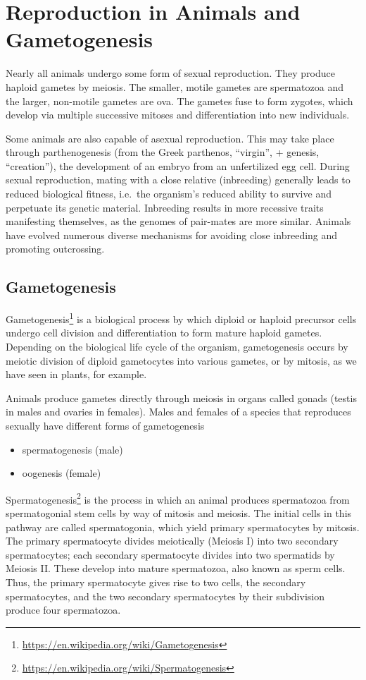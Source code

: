 \documentclass[]{book}
\providecommand{\tightlist}{%
  \setlength{\itemsep}{0pt}\setlength{\parskip}{0pt}}
\let\rmarkdownfootnote\footnote%
\def\footnote{\protect\rmarkdownfootnote}
\renewcommand{\href}[2]{#2\footnote{\url{#1}}}
\theoremstyle{definition}
\theoremstyle{definition}
\theoremstyle{definition}
\theoremstyle{remark}
\begin{document}
\chapter{Reproduction in Animals and
Gametogenesis}\label{reproduction-in-animals-and-gametogenesis}

Nearly all animals undergo some form of sexual reproduction. They
produce haploid gametes by meiosis. The smaller, motile gametes are
spermatozoa and the larger, non-motile gametes are ova. The gametes fuse
to form zygotes, which develop via multiple successive mitoses and
differentiation into new individuals.

Some animals are also capable of asexual reproduction. This may take
place through parthenogenesis (from the Greek parthenos, ``virgin'', +
genesis, ``creation''), the development of an embryo from an
unfertilized egg cell. During sexual reproduction, mating with a close
relative (inbreeding) generally leads to reduced biological fitness,
i.e.~the organism's reduced ability to survive and perpetuate its
genetic material. Inbreeding results in more recessive traits
manifesting themselves, as the genomes of pair-mates are more similar.
Animals have evolved numerous diverse mechanisms for avoiding close
inbreeding and promoting outcrossing.

\section{Gametogenesis}\label{gametogenesis}

\href{https://en.wikipedia.org/wiki/Gametogenesis}{Gametogenesis} is a
biological process by which diploid or haploid precursor cells undergo
cell division and differentiation to form mature haploid gametes.
Depending on the biological life cycle of the organism, gametogenesis
occurs by meiotic division of diploid gametocytes into various gametes,
or by mitosis, as we have seen in plants, for example.

Animals produce gametes directly through meiosis in organs called gonads
(testis in males and ovaries in females). Males and females of a species
that reproduces sexually have different forms of gametogenesis

\begin{itemize}
  \tightlist
  \item
  spermatogenesis (male)
  \item
  oogenesis (female)
\end{itemize}

\href{https://en.wikipedia.org/wiki/Spermatogenesis}{Spermatogenesis} is
the process in which an animal produces spermatozoa from spermatogonial
stem cells by way of mitosis and meiosis. The initial cells in this
pathway are called spermatogonia, which yield primary spermatocytes by
mitosis. The primary spermatocyte divides meiotically (Meiosis I) into
two secondary spermatocytes; each secondary spermatocyte divides into
two spermatids by Meiosis II. These develop into mature spermatozoa,
also known as sperm cells. Thus, the primary spermatocyte gives rise to
two cells, the secondary spermatocytes, and the two secondary
spermatocytes by their subdivision produce four spermatozoa.
\end{document}
